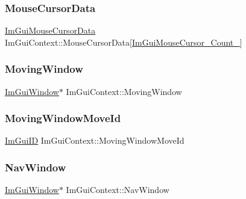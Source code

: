 \subsubsection{\texorpdfstring{Mouse\+Cursor\+Data}{MouseCursorData}}
{\footnotesize\ttfamily \mbox{\hyperlink{struct_im_gui_mouse_cursor_data}{Im\+Gui\+Mouse\+Cursor\+Data}} Im\+Gui\+Context\+::\+Mouse\+Cursor\+Data\mbox{[}\mbox{\hyperlink{imgui_8h_a2eb1181cc1d7872a061df8731141dde9aa2c8807fa1d95bf43b63b3bd946b3fd0}{Im\+Gui\+Mouse\+Cursor\+\_\+\+Count\+\_\+}}\mbox{]}}

\mbox{\label{struct_im_gui_context_a28078cc22f615213fd8544016cd6ae20}} 
\subsubsection{\texorpdfstring{Moving\+Window}{MovingWindow}}
{\footnotesize\ttfamily \mbox{\hyperlink{struct_im_gui_window}{Im\+Gui\+Window}}$\ast$ Im\+Gui\+Context\+::\+Moving\+Window}

\mbox{\label{struct_im_gui_context_abfd9589ba8b4d6b78bd24d46696ed820}} 
\subsubsection{\texorpdfstring{Moving\+Window\+Move\+Id}{MovingWindowMoveId}}
{\footnotesize\ttfamily \mbox{\hyperlink{imgui_8h_a1785c9b6f4e16406764a85f32582236f}{Im\+Gui\+ID}} Im\+Gui\+Context\+::\+Moving\+Window\+Move\+Id}

\mbox{\label{struct_im_gui_context_ae06077e45c894488b28baaf2d7ff8e41}} 
\subsubsection{\texorpdfstring{Nav\+Window}{NavWindow}}
{\footnotesize\ttfamily \mbox{\hyperlink{struct_im_gui_window}{Im\+Gui\+Window}}$\ast$ Im\+Gui\+Context\+::\+Nav\+Window}

